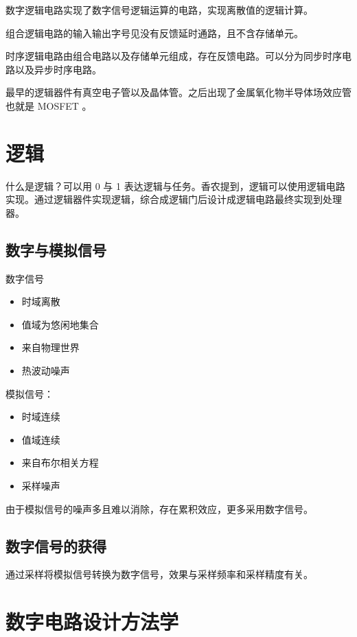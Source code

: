 \documentclass[cn,11pt,chinese,black,simple]{../elegantbook}
\begin{document}
数字逻辑电路实现了数字信号逻辑运算的电路，实现离散值的逻辑计算。

组合逻辑电路的输入输出字号见没有反馈延时通路，且不含存储单元。

时序逻辑电路由组合电路以及存储单元组成，存在反馈电路。可以分为同步时序电路以及异步时序电路。

最早的逻辑器件有真空电子管以及晶体管。之后出现了金属氧化物半导体场效应管也就是 MOSFET 。

\section{逻辑}

什么是逻辑？可以用 0 与 1 表达逻辑与任务。香农提到，逻辑可以使用逻辑电路实现。通过逻辑器件实现逻辑，综合成逻辑门后设计成逻辑电路最终实现到处理器。

\subsection{数字与模拟信号}

数字信号

\begin{itemize}
    \item 时域离散
    \item 值域为悠闲地集合
    \item 来自物理世界
    \item 热波动噪声
\end{itemize}

模拟信号：

\begin{itemize}
    \item 时域连续
    \item 值域连续
    \item 来自布尔相关方程
    \item 采样噪声
\end{itemize}


由于模拟信号的噪声多且难以消除，存在累积效应，更多采用数字信号。

\subsection{数字信号的获得}

通过采样将模拟信号转换为数字信号，效果与采样频率和采样精度有关。


\section{数字电路设计方法学}
\end{document}
